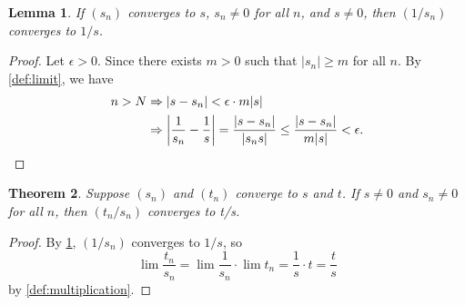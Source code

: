 \documentclass[12pt, lettersize]{book}
\theoremstyle{plain}
\newtheorem{thm}{Theorem}[section]
\newtheorem{lem}[thm]{Lemma}
\theoremstyle{definition}
\theoremstyle{remark}
\begin{document}
		\begin{lem}\label{def:reciprocal}
		If $(s_n)$ converges to $s$, $s_n\neq 0$ for all $n$, and $s\neq 0$, then $(1/s_n)$ converges to $1/s$.
		\end{lem}
		\begin{proof}
		Let $\epsilon>0$. Since there exists $m>0$ such that $|s_n|\geq m$ for all $n$. By \ref{def:limit}, we have
		\begin{align*}
			n>N &\Rightarrow |s-s_n|<\epsilon\cdot m|s|\\
				&\Rightarrow \abs{\frac{1}{s_n}-\frac{1}{s}}=\frac{|s-s_n|}{|s_ns|}\leq\frac{|s-s_n|}{m|s|}<\epsilon.
		\end{align*} 
		\end{proof}
	
		\begin{thm}
		Suppose $(s_n)$ and $(t_n)$ converge to $s$ and $t$. If $s\neq 0$ and $s_n\neq 0$ for all $n$, then $(t_n/s_n)$ converges to t/s.
		\end{thm}
		\begin{proof}
		By \ref{def:reciprocal}, $(1/s_n)$ converges to $1/s$, so
		\begin{displaymath}
			\lim\frac{t_n}{s_n}=\lim\frac{1}{s_n}\cdot\lim t_n=\frac{1}{s}\cdot t=\frac{t}{s}
		\end{displaymath}
		by \ref{def:multiplication}.
		\end{proof}
		
\end{document}
